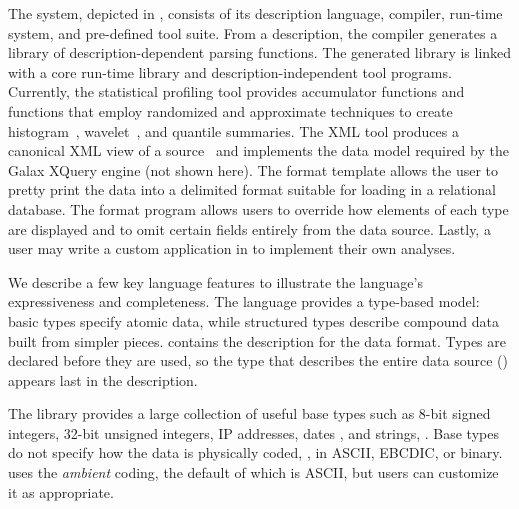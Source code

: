 The \pads{} system, depicted in , consists of its
description language, compiler, run-time system, and pre-defined tool
suite.  From a description, the compiler generates a library of
description-dependent parsing functions.  The generated library is
linked with a core run-time library and description-independent tool
programs.  Currently, the statistical profiling tool provides
accumulator functions and functions that employ randomized and
approximate techniques to create histogram~\cite{histograms},
wavelet~\cite{histograms-wavelets}, and quantile
summaries\cite{quantiles}.  The XML tool produces a canonical XML view
of a \pads{} source~\cite{fernandez+:padx} and implements the data
model required by the Galax XQuery engine (not shown here).
The format template allows the user to pretty print the data into a  
delimited format suitable for loading in a relational database.   
  The format program allows users to override how  
elements of each type are displayed and to omit certain fields  
entirely from the data source.
Lastly, a user may write a custom
application in \C{} to implement their own analyses.

We describe a few key language features to illustrate the language's
expressiveness and completeness.  The language provides a type-based
model: basic types specify atomic data, while structured types
describe compound data built from simpler pieces.
 contains the \pads{} description for the
\dibbler{} data format.  Types are declared
before they are used, so the type that describes the entire data
source () appears last in the description.

The \pads{} library provides a large collection of useful
base types such as 8-bit signed integers, 32-bit unsigned integers, IP
addresses, dates , and strings, \etc{}.  Base types do not specify how
the data is physically coded, \ie{}, in ASCII, EBCDIC, or binary.  \pads{} uses
the \textit{ambient} coding, the default of which is ASCII, but users
can customize it as appropriate.

